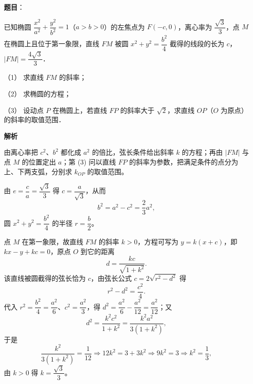 \begin{answer}

\textbf{题目}：

已知椭圆 \(\dfrac{x^2}{a^2}+\dfrac{y^2}{b^2}=1\)（\(a>b>0\)）的左焦点为 \(F(-c,0)\)，离心率为 \(\dfrac{\sqrt{3}}{3}\)，点 \(M\) 在椭圆上且位于第一象限，直线 \(FM\) 被圆 \(x^2+y^2=\dfrac{b^2}{4}\) 截得的线段的长为 \(c\)，\(|FM|=\dfrac{4\sqrt{3}}{3}\)．

（1） 求直线 \(FM\) 的斜率；

（2） 求椭圆的方程；

（3） 设动点 \(P\) 在椭圆上，若直线 \(FP\) 的斜率大于 \(\sqrt{2}\)，求直线 \(OP\)（\(O\) 为原点）的斜率的取值范围．

\textbf{解析}

由离心率把 \(c^{2}\)、\(b^{2}\) 都化成 \(a^{2}\) 的倍比，弦长条件给出斜率 \(k\) 的方程；再由 \(|FM|\) 与点 \(M\) 的位置定出 \(a\)；第 (3) 问以直线 \(FP\) 的斜率为参数，把满足条件的点分为上、下两支弧，分别求 \(k_{OP}\) 的取值范围。


由 \(e=\dfrac{c}{a}=\dfrac{\sqrt{3}}{3}\) 得 \(c=\dfrac{a}{\sqrt{3}}\)，从而
\nopagebreak[4]
\[
b^{2}=a^{2}-c^{2}=\dfrac{2}{3}a^{2},
\]
圆 \(x^{2}+y^{2}=\dfrac{b^{2}}{4}\) 的半径 \(r=\dfrac{b}{2}\)。

点 \(M\) 在第一象限，故直线 \(FM\) 的斜率 \(k>0\)，方程可写为 \(y=k(x+c)\)，即 \(kx-y+kc=0\)，原点 \(O\) 到它的距离
\nopagebreak[4]
\[
d=\dfrac{kc}{\sqrt{1+k^{2}}} .
\]
该直线被圆截得的弦长恰为 \(c\)，由弦长公式 \(c=2\sqrt{r^{2}-d^{2}}\) 得
\nopagebreak[4]
\[
r^{2}-d^{2}=\dfrac{c^{2}}{4}.
\]
代入 \(r^{2}=\dfrac{b^{2}}{4}=\dfrac{a^{2}}{6}\)、\(c^{2}=\dfrac{a^{2}}{3}\)，得 \(d^{2}=\dfrac{a^{2}}{6}-\dfrac{a^{2}}{12}=\dfrac{a^{2}}{12}\)；又
\nopagebreak[4]
\[
d^{2}=\dfrac{k^{2}c^{2}}{1+k^{2}}=\dfrac{k^{2}a^{2}}{3(1+k^{2})},
\]
于是
\nopagebreak[4]
\[
\dfrac{k^{2}}{3(1+k^{2})}=\dfrac{1}{12} \Longrightarrow 12k^{2}=3+3k^{2} \Longrightarrow 9k^{2}=3 \Longrightarrow k^{2}=\dfrac{1}{3},
\]
由 \(k>0\) 得 \(k=\dfrac{\sqrt{3}}{3}\)。



\end{answer}
